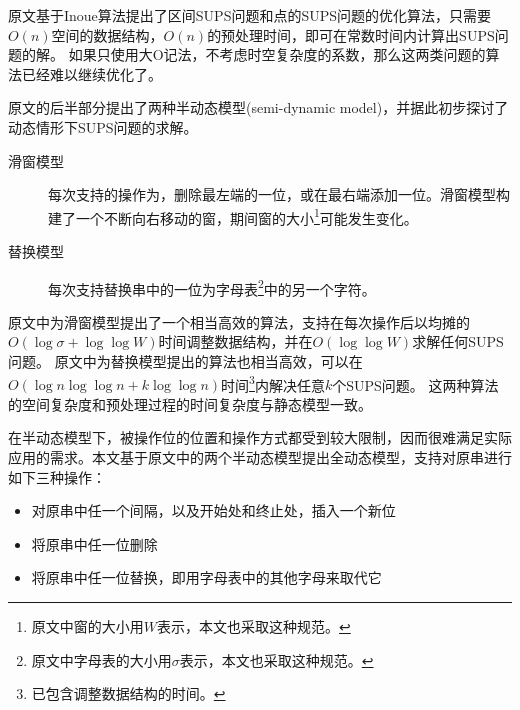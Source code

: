 
原文基于Inoue算法提出了区间SUPS问题和点的SUPS问题的优化算法，只需要$O(n)$空间的数据结构，$O(n)$的预处理时间，即可在常数时间内计算出SUPS问题的解。
如果只使用大O记法，不考虑时空复杂度的系数，那么这两类问题的算法已经难以继续优化了。

原文的后半部分提出了两种半动态模型(semi-dynamic model)，并据此初步探讨了动态情形下SUPS问题的求解。

\begin{description}
    \item[滑窗模型] 每次支持的操作为，删除最左端的一位，或在最右端添加一位。滑窗模型构建了一个不断向右移动的窗，期间窗的大小\footnote{原文中窗的大小用$W$表示，本文也采取这种规范。}可能发生变化。
    \item[替换模型] 每次支持替换串中的一位为字母表\footnote{原文中字母表的大小用$\sigma$表示，本文也采取这种规范。}中的另一个字符。
\end{description}

原文中为滑窗模型提出了一个相当高效的算法，支持在每次操作后以均摊的$O(\log\sigma + \log\log W)$时间调整数据结构，并在$O(\log\log W)$求解任何SUPS问题。
原文中为替换模型提出的算法也相当高效，可以在$O(\log n \log\log n + k\log\log n)$时间\footnote{已包含调整数据结构的时间。}内解决任意$k$个SUPS问题。
这两种算法的空间复杂度和预处理过程的时间复杂度与静态模型一致。

在半动态模型下，被操作位的位置和操作方式都受到较大限制，因而很难满足实际应用的需求。本文基于原文中的两个半动态模型提出全动态模型，支持对原串进行如下三种操作：
\begin{itemize}
    \item 对原串中任一个间隔，以及开始处和终止处，插入一个新位
    \item 将原串中任一位删除
    \item 将原串中任一位替换，即用字母表中的其他字母来取代它
\end{itemize}
